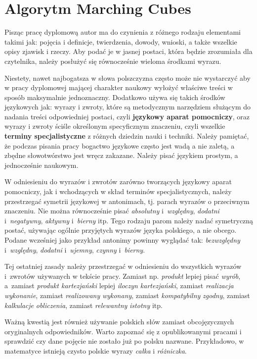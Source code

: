 \section{Algorytm Marching Cubes}

Pisząc pracę dyplomową autor ma do czynienia z różnego rodzaju elementami takimi jak: pojęcia i definicje, twierdzenia, dowody, wnioski, a także wszelkie opisy zjawisk i rzeczy. Aby podać je w jasnej postaci, która będzie zrozumiała dla czytelnika, należy posłużyć się równocześnie wieloma środkami wyrazu.

Niestety, nawet najbogatsza w słowa polszczyzna często może nie wystarczyć aby w pracy dyplomowej mającej charakter naukowy wyłożyć właściwe treści w sposób maksymalnie jednoznaczny. Dodatkowo używa się takich środków językowych jak: wyrazy i zwroty, które są metodycznym narzędziem służącym do nadania treści odpowiedniej postaci, czyli \textbf{językowy aparat pomocniczy}, oraz wyrazy i zwroty ściśle określonym specyficznym znaczeniu, czyli wszelkie \textbf{terminy specjalistyczne} z różnych dziedzin nauki i techniki. Należy pamiętać, że podczas pisania pracy bogactwo językowe często jest wadą a nie zaletą, a zbędne słowotwórstwo jest wręcz zakazane. Należy pisać językiem prostym, a jednocześnie naukowym.



W odniesieniu do wyrazów i zwrotów zarówno tworzących językowy aparat pomocniczy, jak i wchodzących w skład terminów specjalistycznych, należy przestrzegać symetrii językowej w antonimach, tj. parach wyrazów o przeciwnym znaczeniu. Nie można równocześnie pisać  \textit{absolutny} i~\textit{względny},  \textit{dodatni} i~\textit{negatywny},  \textit{aktywny} i~\textit{bierny} itp. Tego rodzaju parom należy nadać symetryczną postać, używając ogólnie przyjętych wyrazów języka polskiego, a nie obcego. Podane wcześniej jako przykład antonimy powinny wyglądać tak:  \textit{bezwzględny} i~\textit{względny},  \textit{dodatni} i~\textit{ujemny},  \textit{czynny} i~\textit{bierny}.

Tej ostatniej zasady należy przestrzegać w odniesieniu do wszystkich wyrazów i~zwrotów używanych w tekście pracy. Zamiast np. \textit{produkt} lepiej pisać \textit{wyrób}, a~zamiast \textit{produkt kartezjański} lepiej \textit{iloczyn kartezjański}, zamiast \textit{realizacja} \pauza \textit{wykonanie}, zamiast \textit{realizowany} \pauza \textit{wykonany}, zamiast \textit{kompatybilny} \pauza \textit{zgodny}, zamiast \textit{kalkulacje} \pauza \textit{obliczenia}, zamiast \textit{relewantny} \pauza \textit{istotny} itp.


Ważną kwestią jest również używanie polskich słów zamiast obcojęzycznych oryginalnych odpowiedników. Warto zapoznać się z opublikowanymi pracami i sprawdzić czy dane pojęcie nie zostało już po polsku nazwane. Przykładowo, w matematyce istnieją czysto polskie wyrazy \textit{całka} i \textit{różniczka}.